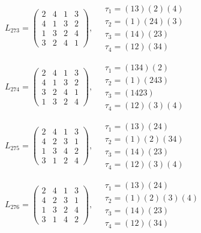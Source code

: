 $L_{273} = \begin{pmatrix} 2 & 4 & 1 & 3 \\ 4 & 1 & 3 & 2 \\ 1 & 3 & 2 & 4 \\ 3 & 2 & 4 & 1 \end{pmatrix}, \quad \begin{matrix} \tau_{1} = (1 3)(2)(4) \\ \tau_{2} = (1)(2 4)(3) \\ \tau_{3} = (1 4)(2 3) \\ \tau_{4} = (1 2)(3 4) \end{matrix}$

$L_{274} = \begin{pmatrix} 2 & 4 & 1 & 3 \\ 4 & 1 & 3 & 2 \\ 3 & 2 & 4 & 1 \\ 1 & 3 & 2 & 4 \end{pmatrix}, \quad \begin{matrix} \tau_{1} = (1 3 4)(2) \\ \tau_{2} = (1)(2 4 3) \\ \tau_{3} = (1 4 2 3) \\ \tau_{4} = (1 2)(3)(4) \end{matrix}$

$L_{275} = \begin{pmatrix} 2 & 4 & 1 & 3 \\ 4 & 2 & 3 & 1 \\ 1 & 3 & 4 & 2 \\ 3 & 1 & 2 & 4 \end{pmatrix}, \quad \begin{matrix} \tau_{1} = (1 3)(2 4) \\ \tau_{2} = (1)(2)(3 4) \\ \tau_{3} = (1 4)(2 3) \\ \tau_{4} = (1 2)(3)(4) \end{matrix}$

$L_{276} = \begin{pmatrix} 2 & 4 & 1 & 3 \\ 4 & 2 & 3 & 1 \\ 1 & 3 & 2 & 4 \\ 3 & 1 & 4 & 2 \end{pmatrix}, \quad \begin{matrix} \tau_{1} = (1 3)(2 4) \\ \tau_{2} = (1)(2)(3)(4) \\ \tau_{3} = (1 4)(2 3) \\ \tau_{4} = (1 2)(3 4) \end{matrix}$

